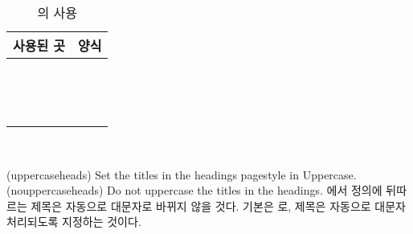 \begin{table}
\centering
\caption{\protect{}의 사용}\label{tab:callthispagestyle}
\begin{tabular}{l !{\qquad} l} \toprule
사용된 곳 & 양식 \\ \midrule
\cmd{\book}    &  \\
\cmd{\chapter} &  \\
\cmd{\cleardoublepage} &  \\
\cmd{\cleartorecto} &  \\
\cmd{\cleartoverso} &  \\
\cmd{\epigraphhead} &  \\
\cmd{\listoffigures} &  \\
\cmd{\listoftables} &  \\
\cmd{\maketitle} &  \\
\cmd{\part}      &  \\
\cmd{\tableofcontents} &  \\
 &  \\
 &  \\
 &  \\
\bottomrule
\end{tabular}
\end{table}

\begin{syntax}
\cmd{\uppercaseheads} \cmd{\nouppercaseheads}  \\
\end{syntax}
\glossary(uppercaseheads)%
  {}%
  {Set the titles in the headings pagestyle in Uppercase.}
\glossary(nouppercaseheads)%
  {}%
  {Do not uppercase the titles in the headings.}
에서 \cmd{\nouppercaseheads} 정의에 뒤따르는 제목은 자동으로
대문자로 바뀌지 않을 것다.
기본은 \cmd{\uppercaseheads}로, 제목은 자동으로 대문자 처리되도록 지정하는
것이다.

